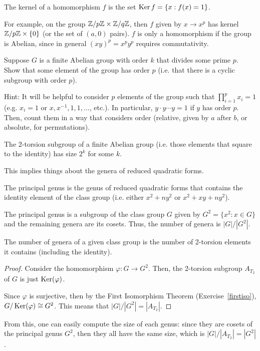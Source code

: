 \begin{defn}
The kernel of a homomorphism $f$ is the set $\operatorname{Ker} f = \{x:f(x) = 1\}$.
\end{defn}
For example, on the group $\mathbb{Z}/p\mathbb{Z} \times \mathbb{Z}/q\mathbb{Z}$, then $f$ given by $x\to x^p$ has kernel $\mathbb{Z}/p\mathbb{Z}\times \{0\}$ (or the set of $(a,0)$ pairs). $f$ is only a homomorphism if the group is Abelian, since in general $(xy)^p = x^p y^p$ requires commutativity.
\begin{ex}
Suppose $G$ is a finite Abelian group with order $k$ that divides some prime $p$. Show that some element of the group has order $p$ (i.e. that there is a cyclic subgroup with order $p$).

Hint: It will be helpful to consider $p$ elements of the group such that $\prod_{i=1}^p x_i = 1$ (e.g. $x_i= 1$ or $x, x^{-1}, 1, 1,\dots$, etc.). In particular, $y\cdot y\dotsb y =1$ if $y$ has order $p$. Then, count them in a way that considers order (relative, given by $a$ after $b$, or absolute, for permutations).
\end{ex}

\begin{cor}
The 2-torsion subgroup of a finite Abelian group (i.e. those elements that square to the identity) has size $2^k$ for some $k$.
\end{cor}%
This implies things about the genera of reduced quadratic forms.
\begin{defn}
The principal genus is the genus of reduced quadratic forms that contains the identity element of the class group (i.e. either $x^2+ny^2$ or $x^2+xy+ny^2$).
\end{defn}
The principal genus is a subgroup of the class group $G$ given by $G^2 = \{x^2: x\in G\}$ and the remaining genera are its cosets. Thus, the number of genera is $|G|/|G^2|$.
\begin{claim}
The number of genera of a given class group is the number of 2-torsion elements it contains (including the identity).
\end{claim}
\begin{proof}
Consider the homomorphism $\varphi: G \to G^2$. Then, the 2-torsion subgroup $A_{T_2}$ of $G$ is just $\operatorname{Ker}(\varphi)$.

Since $\varphi$ is surjective, then by the First Isomorphism Theorem (Exercise~\ref{firstiso}), $G / \operatorname{Ker}(\varphi) \cong G^2$. This means that $|G|/|G^2| = |A_{T_2}|$.
\end{proof}
From this, one can easily compute the size of each genus: since they are cosets of the principal genus $G^2$, then they all have the same size, which is $|G|/|A_{T_2}| = |G^2|$.

